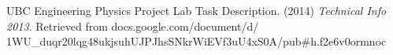 \begin{thebibliography}
\bibitem UBC Engineering Physics Project Lab Task Description. (2014) \textit{Technical Info 2013}. Retrieved from docs.google.com/document/d/\\1WU\_duqr20lqg48ukjsuhUJPJhsSNkrWiEVf3uU4xS0A/pub\#h.f2e6v0ormnoc
\end{thebibliography}